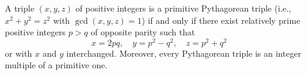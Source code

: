 A triple $(x, y, z)$ of positive integers is a primitive Pythagorean triple (i.e., $x^2 + y^2 = z^2$ with $\gcd(x, y, z) = 1$) if and only if there exist relatively prime positive integers $p > q$ of opposite parity such that
$$x = 2pq, \quad y = p^2 - q^2, \quad z = p^2 + q^2$$
or with $x$ and $y$ interchanged. Moreover, every Pythagorean triple is an integer multiple of a primitive one.
